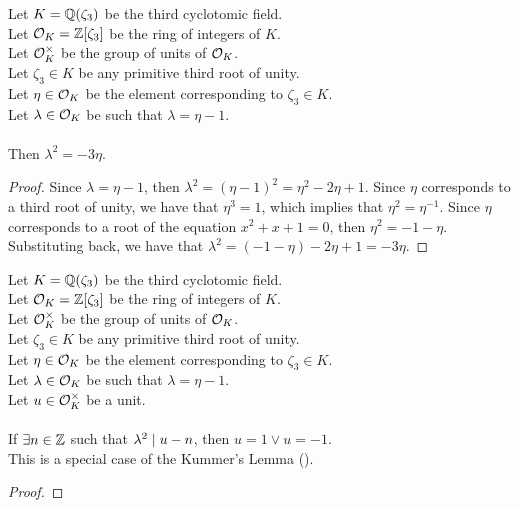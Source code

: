 \begin{lemma}
    \label{lmm:lambda_sq}
    \leanok
    Let $K = \mathbb{Q}(\zeta_3)$ be the third cyclotomic field. \\
    Let $\mathcal{O}_K = \mathbb{Z}[\zeta_3]$ be the ring of integers of $K$. \\
    Let $\mathcal{O}^\times_K$ be the group of units of $\mathcal{O}_K$. \\
    Let $\zeta_3 \in K$ be any primitive third root of unity. \\
    Let $\eta \in \mathcal{O}_K$ be the element corresponding to $\zeta_3 \in K$. \\
    Let $\lambda \in \mathcal{O}_K$ be such that $\lambda = \eta -1$. \\\\
    Then $\lambda^2 = -3 \eta$.
\end{lemma}
\begin{proof}
    \leanok
    Since $\lambda = \eta -1$, then $\lambda^2 = (\eta - 1)^2 = \eta^2 - 2\eta + 1$.
    Since $\eta$ corresponds to a third root of unity, we have that $\eta^3 = 1$,
    which implies that $\eta^2 = \eta^{-1}$.
    Since $\eta$ corresponds to a root of the equation $x^2 + x + 1 = 0$, then $\eta^2 = -1 - \eta$.
    Substituting back, we have that $\lambda^2 = (-1 - \eta) - 2\eta + 1 = -3\eta$.
\end{proof}

\begin{theorem}
    \label{lmm:eq_one_or_neg_one_of_unit_of_congruent}
    \leanok
    Let $K = \mathbb{Q}(\zeta_3)$ be the third cyclotomic field. \\
    Let $\mathcal{O}_K = \mathbb{Z}[\zeta_3]$ be the ring of integers of $K$. \\
    Let $\mathcal{O}^\times_K$ be the group of units of $\mathcal{O}_K$. \\
    Let $\zeta_3 \in K$ be any primitive third root of unity. \\
    Let $\eta \in \mathcal{O}_K$ be the element corresponding to $\zeta_3 \in K$. \\
    Let $\lambda \in \mathcal{O}_K$ be such that $\lambda = \eta -1$. \\
    Let $u \in \mathcal{O}^\times_K$ be a unit. \\\\
    If $\exists n \in \mathbb{Z}$ such that $\lambda^2 \mid u - n$, then
    $u = 1 \lor u = -1$. \\
    This is a special case of the Kummer's Lemma ().
\end{theorem}
\begin{proof}
    \leanok
\end{proof}

